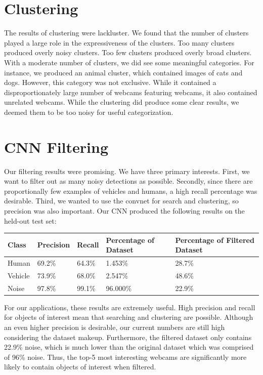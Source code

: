 \documentclass[10pt]{article} %
\begin{document}
\section{Clustering}
The results of clustering were lackluster. We found that the number of clusters
played a large role in the expressiveness of the clusters. Too many clusters
produced overly noisy clusters. Too few clusters produced overly broad
clusters. With a moderate number of clusters, we did see some meaningful
categories. For instance, we produced an animal cluster, which contained images
of cats and dogs. However, this category was not exclusive. While it contained
a disproportionately large number of webcams featuring webcams, it also
contained unrelated webcams. While the clustering did produce some clear
results, we deemed them to be too noisy for useful categorization.

\section{CNN Filtering}
Our filtering results were promising. We have three primary interests. First,
we want to filter out as many noisy detections as possible.  Secondly, since
there are proportionally few examples of vehicles and humans, a high recall
percentage was desirable. Third, we wanted to use the convnet for search and
clustering, so precision was also important. Our CNN produced the following
results on the held-out test set:
\begin{center}
  \begin{tabular}{ | m{5em} | m{5em}| m{5em} | m{9em} | m{13em} | } 
    \hline
    Class & Precision & Recall & Percentage of Dataset & Percentage of Filtered Dataset  \\ 
    \hline
    Human & 69.2\% & 64.3\% & 1.453\% & 28.7\%  \\ 
    \hline
    Vehicle & 73.9\%  & 68.0\% & 2.547\% & 48.6\% \\ 
    \hline
    Noise & 97.8\%  &99.1\% & 96.000\% & 22.9\%  \\ 
    \hline
  \end{tabular}
\end{center}

For our applications, these results are extremely useful. High precision and
recall for objects of interest mean that searching and clustering are possible.
Although an even higher precision is desirable, our current numbers are still
high considering the dataset makeup. Furthermore, the filtered dataset only
contains 22.9\% noise, which is much lower than the original dataset which was
comprised of 96\% noise. Thus, the top-5 most interesting webcams are
significantly more likely to contain objects of interest when filtered.
\end{document}
